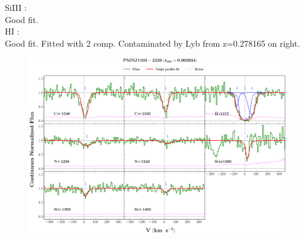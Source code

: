 \documentclass[12pt,draft]{report}
\begin{document}
SiIII :  \\  \hspace*{1.5cm} 
        Good fit.  \\

HI :  \\  \hspace*{1.5cm} 
        Good fit. Fitted with 2 comp. Contaminated by Lyb from z=0.278165 on right.  \\



\newpage

\begin{landscape}

\begin{figure}
    \centering
    \vspace{-20mm}
    \hspace*{-35mm}
    \includegraphics[width=1.25\linewidth]{System-Plots/PMNJ1103-2329_z=0.003934_sys_plot.png}
\end{figure}

\end{landscape}
\end{document}
